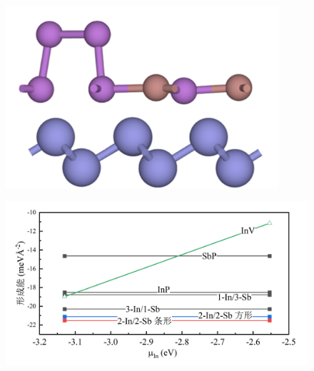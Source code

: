 \begin{figure}
\begin{minipage}[b]{0.4\textwidth}
{            \includegraphics[width=0.9\textwidth]{pic/IS_structure_SbTonInV.png}
        }
    \end{minipage}
\end{figure}

\begin{figure}
    \includegraphics{pic/IS_DFT_1InSb_FlipVsInV.png}
\end{figure}

